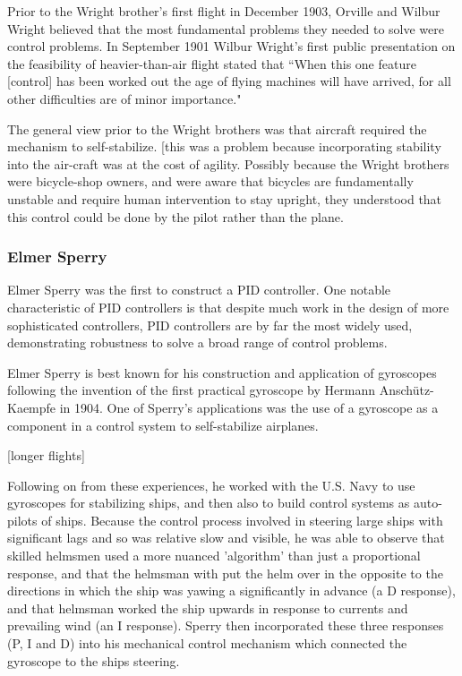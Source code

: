 Prior to the Wright brother's first flight in December 1903, Orville and Wilbur Wright believed that
the most fundamental problems they needed to solve were control problems. In September 1901 Wilbur
Wright's first public presentation on the feasibility of heavier-than-air flight stated that ``When
this one feature [control] has been worked out the age of flying machines will have arrived, for all
other difficulties are of minor importance."\cite{wright1908}


The general view prior to the Wright brothers was that aircraft required the mechanism to
self-stabilize. [this was a problem because incorporating stability into the air-craft was at the
cost of agility. Possibly because the Wright brothers were bicycle-shop owners, and were aware that
bicycles are fundamentally unstable and require human intervention to stay upright, they understood
that this control could be done by the pilot rather than the plane.

\subsubsection{Elmer Sperry}

Elmer Sperry was the first to construct a PID controller. One notable characteristic of PID
controllers is that despite much work in the design of more sophisticated controllers, PID
controllers are by far the most widely used, demonstrating robustness to solve a broad range of
control problems.

Elmer Sperry is best known for his construction and application of gyroscopes following the
invention of the first practical gyroscope by Hermann Anschütz-Kaempfe in 1904. One of Sperry's
applications was the use of a gyroscope as a component in a control system to self-stabilize
airplanes.

[longer flights]
 
Following on from these experiences, he worked with the U.S. Navy to use gyroscopes for stabilizing
ships, and then also to build control systems as auto-pilots of ships. Because the control process
involved in steering large ships with significant lags and so was relative slow and visible, he was
able to observe that skilled helmsmen used a more nuanced 'algorithm' than just a proportional
response, and that the helmsman with put the helm over in the opposite to the directions in which
the ship was yawing a significantly in advance (a D response), and that helmsman worked the ship
upwards in response to currents and prevailing wind (an I response). Sperry then incorporated these
three responses (P, I and D) into his mechanical control mechanism which connected the gyroscope to
the ships steering.

